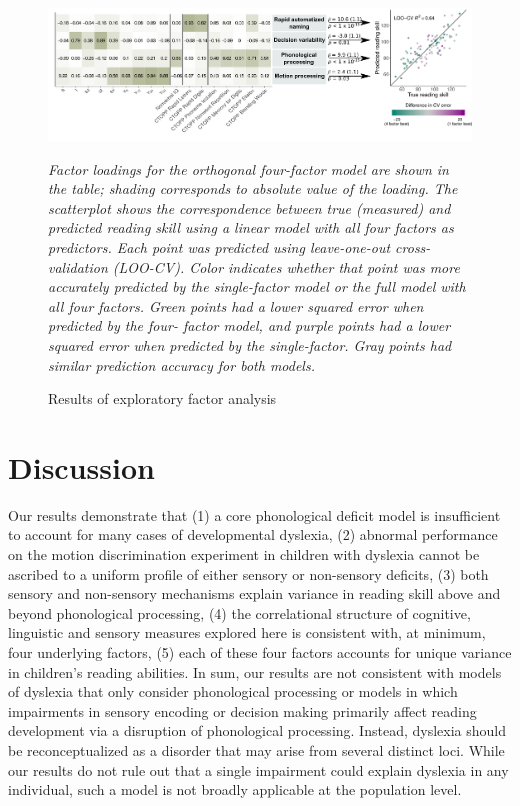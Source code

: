\documentclass[../uwthesis.tex]{subfiles}
\begin{document}
\begin{figure}
    \centering
    \caption{Results of exploratory factor analysis}
    \label{fig:p3_fig_5}
    \includegraphics[width=18cm]{images/paper_3/5_factor_analysis.png}
    \item \textit{Factor loadings for the orthogonal four-factor model are shown in the table; shading
    corresponds to absolute value of the loading. The scatterplot shows the correspondence between
    true (measured) and predicted reading skill using a linear model with all four factors as
    predictors. Each point was predicted using leave-one-out cross-validation (LOO-CV). Color
    indicates whether that point was more accurately predicted by the single-factor model or the full
    model with all four factors. Green points had a lower squared error when predicted by the four-
    factor model, and purple points had a lower squared error when predicted by the single-factor.
    Gray points had similar prediction accuracy for both models.}
\end{figure}

\section{Discussion}
Our results demonstrate that (1) a core phonological deficit model is insufficient to account
for many cases of developmental dyslexia, (2) abnormal performance on the motion discrimination
experiment in children with dyslexia cannot be ascribed to a uniform profile of either sensory or
non-sensory deficits, (3) both sensory and non-sensory mechanisms explain variance in reading
skill above and beyond phonological processing, (4) the correlational structure of cognitive,
linguistic and sensory measures explored here is consistent with, at minimum, four underlying
factors, (5) each of these four factors accounts for unique variance in children’s reading abilities.
In sum, our results are not consistent with models of dyslexia that only consider phonological
processing or models in which impairments in sensory encoding or decision making primarily
affect reading development via a disruption of phonological processing. Instead, dyslexia should
be reconceptualized as a disorder that may arise from several distinct loci. While our results do not
rule out that a single impairment could explain dyslexia in any individual, such a model is not
broadly applicable at the population level.
\end{document}
